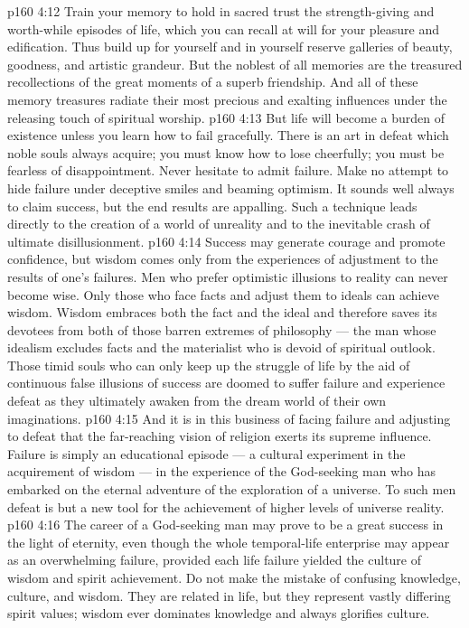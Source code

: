 \vs p160 4:12 Train your memory to hold in sacred trust the strength\hyp{}giving and worth\hyp{}while episodes of life, which you can recall at will for your pleasure and edification. Thus build up for yourself and in yourself reserve galleries of beauty, goodness, and artistic grandeur. But the noblest of all memories are the treasured recollections of the great moments of a superb friendship. And all of these memory treasures radiate their most precious and exalting influences under the releasing touch of spiritual worship.
\vs p160 4:13 But life will become a burden of existence unless you learn how to fail gracefully. There is an art in defeat which noble souls always acquire; you must know how to lose cheerfully; you must be fearless of disappointment. Never hesitate to admit failure. Make no attempt to hide failure under deceptive smiles and beaming optimism. It sounds well always to claim success, but the end results are appalling. Such a technique leads directly to the creation of a world of unreality and to the inevitable crash of ultimate disillusionment.
\vs p160 4:14 Success may generate courage and promote confidence, but wisdom comes only from the experiences of adjustment to the results of one’s failures. Men who prefer optimistic illusions to reality can never become wise. Only those who face facts and adjust them to ideals can achieve wisdom. Wisdom embraces both the fact and the ideal and therefore saves its devotees from both of those barren extremes of philosophy --- the man whose idealism excludes facts and the materialist who is devoid of spiritual outlook. Those timid souls who can only keep up the struggle of life by the aid of continuous false illusions of success are doomed to suffer failure and experience defeat as they ultimately awaken from the dream world of their own imaginations.
\vs p160 4:15 And it is in this business of facing failure and adjusting to defeat that the far\hyp{}reaching vision of religion exerts its supreme influence. Failure is simply an educational episode --- a cultural experiment in the acquirement of wisdom --- in the experience of the God\hyp{}seeking man who has embarked on the eternal adventure of the exploration of a universe. To such men defeat is but a new tool for the achievement of higher levels of universe reality.
\vs p160 4:16 The career of a God\hyp{}seeking man may prove to be a great success in the light of eternity, even though the whole temporal\hyp{}life enterprise may appear as an overwhelming failure, provided each life failure yielded the culture of wisdom and spirit achievement. Do not make the mistake of confusing knowledge, culture, and wisdom. They are related in life, but they represent vastly differing spirit values; wisdom ever dominates knowledge and always glorifies culture.
